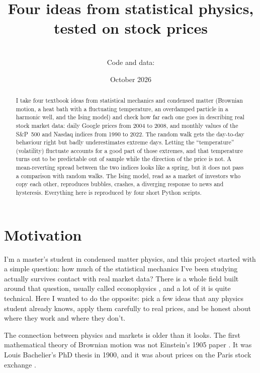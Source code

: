 \documentclass[11pt,a4paper]{article}
\title{\textbf{Four ideas from statistical physics,\\ tested on stock prices}}
\author{\myname\\[0.2em]\small Code and data: \repo}
\date{October 2026}
\begin{document}
\maketitle

\begin{abstract}
\noindent I take four textbook ideas from statistical mechanics and condensed matter (Brownian motion, a
heat bath with a fluctuating temperature, an overdamped particle in a harmonic well, and the Ising model)
and check how far each one goes in describing real stock market data: daily Google prices from 2004 to
2008, and monthly values of the S\&P~500 and Nasdaq indices from 1990 to 2022. The random walk gets the
day-to-day behaviour right but badly underestimates extreme days. Letting the ``temperature''
(volatility) fluctuate accounts for a good part of those extremes, and that temperature turns out to be
predictable out of sample while the direction of the price is not. A mean-reverting spread between
the two indices looks like a spring, but it does not pass a comparison with random walks. The Ising model,
read as a market of investors who copy each other, reproduces bubbles, crashes, a diverging response to
news and hysteresis. Everything here is reproduced by four short Python scripts.
\end{abstract}

\tableofcontents

\section{Motivation}

I'm a master's student in condensed matter physics, and this project started with a simple question:
how much of the statistical mechanics I've been studying actually survives contact with real market data?
There is a whole field built around that question, usually called econophysics
\cite{mantegna2000,bouchaud2003}, and a lot of it is quite technical. Here I wanted to do the opposite:
pick a few ideas that any physics student already knows, apply them carefully to real prices, and be honest
about where they work and where they don't.

The connection between physics and markets is older than it looks. The first mathematical theory of
Brownian motion was not Einstein's 1905 paper \cite{einstein1905}. It was Louis Bachelier's PhD thesis in
1900, and it was about prices on the Paris stock exchange \cite{bachelier1900}.
\end{document}
